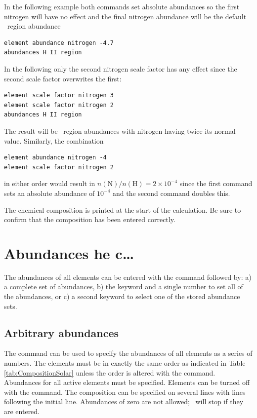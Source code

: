 In the following example both commands set absolute abundances so the
first nitrogen  will have no effect and the final nitrogen abundance
will be the default \hii\ region abundance
\begin{verbatim}
element abundance nitrogen -4.7
abundances H II region
\end{verbatim}
In the following only the second nitrogen scale factor has any
effect since the second scale factor overwrites the first:
\begin{verbatim}
element scale factor nitrogen 3
element scale factor nitrogen 2
abundances H II region
\end{verbatim}
The result will be \hii\ region abundances with nitrogen having twice its
normal value.
Similarly, the combination
\begin{verbatim}
element abundance nitrogen -4
element scale factor nitrogen 2
\end{verbatim}
in either order would result in
$n(\mathrm{N})/n(\mathrm{H}) = 2\times10^{-4}$ since the first command
sets an absolute abundance of $10^{-4}$ and the second command
doubles this.

The chemical composition is printed at the start of the calculation.
Be sure to confirm that the composition has been entered correctly.

\section{Abundances he c\dots}

The abundances of all elements can be entered with the command
followed by:
a) a complete set of abundances,
b) the keyword  and
a single number to set all of the abundances,
or c) a second keyword to select
one of the stored abundance sets.

\subsection{Arbitrary abundances}

The  command can be used to specify the abundances of all
elements as a series of numbers.
The elements must be in exactly the same
order as indicated in Table \ref{tab:CompositionSolar}
unless the order is altered with the
 command.
Abundances for all active elements must be specified.
Elements can be turned off with the  command.
The composition can be
specified on several lines with  lines
following the initial  line.
Abundances of zero are not allowed; \Cloudy\ will stop if
they are entered.

